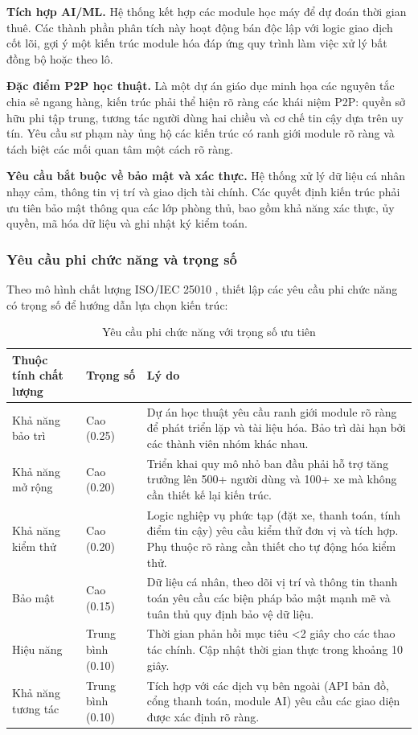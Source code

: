 \textbf{Tích hợp AI/ML.} Hệ thống kết hợp các module học máy để dự đoán thời gian thuê. Các thành phần phân tích này hoạt động bán độc lập với logic giao dịch cốt lõi, gợi ý một kiến trúc module hóa đáp ứng quy trình làm việc xử lý bất đồng bộ hoặc theo lô.

\textbf{Đặc điểm P2P học thuật.} Là một dự án giáo dục minh họa các nguyên tắc chia sẻ ngang hàng, kiến trúc phải thể hiện rõ ràng các khái niệm P2P: quyền sở hữu phi tập trung, tương tác người dùng hai chiều và cơ chế tin cậy dựa trên uy tín. Yêu cầu sư phạm này ủng hộ các kiến trúc có ranh giới module rõ ràng và tách biệt các mối quan tâm một cách rõ ràng.

\textbf{Yêu cầu bắt buộc về bảo mật và xác thực.} Hệ thống xử lý dữ liệu cá nhân nhạy cảm, thông tin vị trí và giao dịch tài chính. Các quyết định kiến trúc phải ưu tiên bảo mật thông qua các lớp phòng thủ, bao gồm khả năng xác thực, ủy quyền, mã hóa dữ liệu và ghi nhật ký kiểm toán.

\subsubsection{Yêu cầu phi chức năng và trọng số}

Theo mô hình chất lượng ISO/IEC 25010 \cite{iso25010}, thiết lập các yêu cầu phi chức năng có trọng số để hướng dẫn lựa chọn kiến trúc:

\begin{table}[h]
\centering
\caption{Yêu cầu phi chức năng với trọng số ưu tiên}
\begin{tabular}{|p{4cm}|p{2.5cm}|p{7.5cm}|}
\hline
\textbf{Thuộc tính chất lượng} & \textbf{Trọng số} & \textbf{Lý do} \\
\hline
Khả năng bảo trì & Cao (0.25) & Dự án học thuật yêu cầu ranh giới module rõ ràng để phát triển lặp và tài liệu hóa. Bảo trì dài hạn bởi các thành viên nhóm khác nhau. \\
\hline
Khả năng mở rộng & Cao (0.20) & Triển khai quy mô nhỏ ban đầu phải hỗ trợ tăng trưởng lên 500+ người dùng và 100+ xe mà không cần thiết kế lại kiến trúc. \\
\hline
Khả năng kiểm thử & Cao (0.20) & Logic nghiệp vụ phức tạp (đặt xe, thanh toán, tính điểm tin cậy) yêu cầu kiểm thử đơn vị và tích hợp. Phụ thuộc rõ ràng cần thiết cho tự động hóa kiểm thử. \\
\hline
Bảo mật & Cao (0.15) & Dữ liệu cá nhân, theo dõi vị trí và thông tin thanh toán yêu cầu các biện pháp bảo mật mạnh mẽ và tuân thủ quy định bảo vệ dữ liệu. \\
\hline
Hiệu năng & Trung bình (0.10) & Thời gian phản hồi mục tiêu <2 giây cho các thao tác chính. Cập nhật thời gian thực trong khoảng 10 giây. \\
\hline
Khả năng tương tác & Trung bình (0.10) & Tích hợp với các dịch vụ bên ngoài (API bản đồ, cổng thanh toán, module AI) yêu cầu các giao diện được xác định rõ ràng. \\
\hline
\end{tabular}
\end{table}

